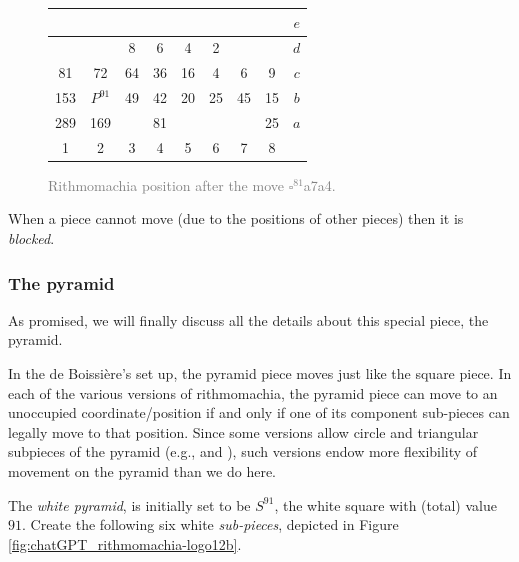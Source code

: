 \documentclass[14pt]{extarticle}
\begin{document}
\begin{figure}[H]
\begin{tabular}{|c|c|c|c|c|c|c|c||c}
\quad  & \quad  & \quad  & \quad  & \quad  & \quad  & \quad  & \quad  & $e$ \\ \hline
\quad  & \quad  & \circlet{\,}8 & \circlet{\,}6 & \circlet{\,}4 & \circlet{\,}2 & \quad  & \quad  & $d$ \\ \hline
\trianglepa{\,}81 & \trianglepa{\,}72 & \circlet{\,}64 & \circlet{\,}36 & \circlet{\,}16 & \circlet{\,}4 & \trianglepa{\,}6 & \trianglepa{\,}9 & $c$ \\ \hline
\squad{\,}153 & \rhombus{\,}$P^{91}$ & \trianglepa{\,}49 & \trianglepa{\,}42 & \trianglepa{\,}20 & \trianglepa{\,}25 & \squad{\,}45 & \squad{\,}15 & $b$ \\ \hline
\squad{\,}289 & \squad{\,}169 & \quad  & \squad{\,}81 & \quad  & \quad  & \quad  & \squad{\,}25 & $a$ \\ \hline
1 &  2 &  3 &  4 &  5 &  6 &  7 &  8  &  \\
\end{tabular} 
\caption{\textcolor{gray}{Rithmomachia position after the move $\square^{81}$a7a4.}}
\label{fig:rithmomachia-after-S81-60-30-with-pyramid2} 
\end{figure}

When a piece cannot move (due to the positions of other pieces)
then it is {\it blocked}.
        
\subsubsection{The pyramid}
\label{sec:pyramid1}

As promised, we will finally discuss all the details about this special piece, the
pyramid.

In the de Boissi\`ere's set up, the pyramid piece moves just like the square piece.
In each of the various versions of rithmomachia,
the pyramid piece can move to an unoccupied coordinate/position
if and only if one of its component sub-pieces can legally move
to that position.
Since some versions allow circle and triangular
subpieces of the pyramid (e.g., \cite{Ne98} and \cite{DG21}),
such versions endow more flexibility
of movement on the pyramid than we do here.

The {\it white pyramid}, is initially set to be $S^{91}$,
the white square with (total) value $91$. 
Create the following six white {\it sub-pieces}, depicted in
Figure \ref{fig:chatGPT_rithmomachia-logo12b}.
\end{document}
